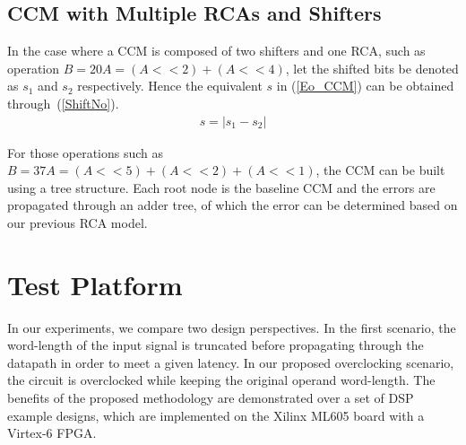\documentclass[journal]{IEEEtran}
\begin{document}
\subsection{CCM with Multiple RCAs and Shifters}\label{CCM_Multi}
In the case where a CCM is composed of two shifters and one RCA, such as operation $\!B\!=\!20A\!=\!(\!A<<2)+(\!A<<4)$, let the shifted bits be denoted as $s_1$ and $s_2$ respectively. Hence the equivalent $s$ in (\ref{Eo_CCM}) can be obtained through~(\ref{ShiftNo}).
%
\begin{eqnarray}\label{ShiftNo}
  s=\left|s_1-s_2\right|
\end{eqnarray}

For those operations such as $B=37A=(A<<5)+(A<<2)+(A<<1)$, the CCM can be built using a tree structure. Each root node is the baseline CCM and the errors are propagated through an adder tree, of which the error can be determined based on our previous RCA model.

\section{Test Platform}\label{Section_ExpSetup}
In our experiments, we compare two design perspectives. In the first scenario, the word-length of the input signal is truncated before propagating through the datapath in order to meet a given latency. In our proposed overclocking scenario, the circuit is overclocked while keeping the original operand word-length. The benefits of the proposed methodology are demonstrated over a set of DSP example designs, which are implemented on the Xilinx ML605 board with a Virtex-6 FPGA.
\end{document}
